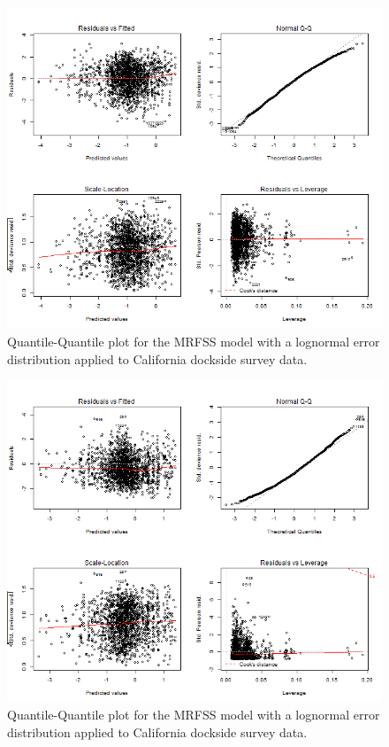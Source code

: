 \documentclass[12pt,]{article}
\begin{document}
\FloatBarrier

\newpage

\begin{figure}[htbp]
\centering
\includegraphics{Figures/MRFSS_CPUE/GLMdiagnosticslognormalMRFSS.png}
\caption{Quantile-Quantile plot for the MRFSS model with a lognormal
error distribution applied to California dockside survey data.
\label{fig:MRFSSlognormal}}
\end{figure}

\begin{figure}[htbp]
\centering
\includegraphics{Figures/MRFSS_CPUE/GLMdiagnosticsgammaMRFSS.png}
\caption{Quantile-Quantile plot for the MRFSS model with a lognormal
error distribution applied to California dockside survey data.
\label{fig:MRFSSgamma}}
\end{figure}
\end{document}
